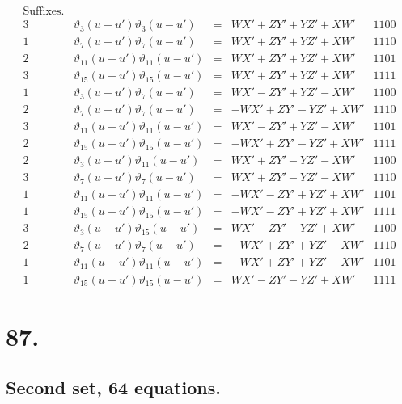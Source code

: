 \documentclass[11pt,a4paper]{article}
\newcommand{\uth}[1]{\vartheta_{#1}}
\begin{document}
\[
\begin{array}{ccccc}
\text{Suffixes.} & & & & \\
\hline
3 & \uth{3}(u+u')\uth{3}(u-u') &=& WX' + ZY' + YZ' + XW' & 1100 \\
1 & \uth{7}(u+u')\uth{7}(u-u') &=& WX' + ZY' + YZ' + XW' & 1110 \\
2 & \uth{11}(u+u')\uth{11}(u-u') &=& WX' + ZY' + YZ' + XW' & 1101 \\
3 & \uth{15}(u+u')\uth{15}(u-u') &=& WX' + ZY' + YZ' + XW' & 1111 \\
\hline
1 & \uth{3}(u+u')\uth{7}(u-u') &=& WX' - ZY' + YZ' - XW' & 1100 \\
2 & \uth{7}(u+u')\uth{7}(u-u') &=& -WX' + ZY' - YZ' + XW' & 1110 \\
3 & \uth{11}(u+u')\uth{11}(u-u') &=& WX' - ZY' + YZ' - XW' & 1101 \\
2 & \uth{15}(u+u')\uth{15}(u-u') &=& -WX' + ZY' - YZ' + XW' & 1111 \\
\hline
2 & \uth{3}(u+u')\uth{11}(u-u') &=& WX' + ZY' - YZ' - XW' & 1100 \\
3 & \uth{7}(u+u')\uth{7}(u-u') &=& WX' + ZY' - YZ' - XW' & 1110 \\
1 & \uth{11}(u+u')\uth{11}(u-u') &=& -WX' - ZY' + YZ' + XW' & 1101 \\
1 & \uth{15}(u+u')\uth{15}(u-u') &=& -WX' - ZY' + YZ' + XW' & 1111 \\
\hline
3 & \uth{3}(u+u')\uth{15}(u-u') &=& WX' - ZY' - YZ' + XW' & 1100 \\
2 & \uth{7}(u+u')\uth{7}(u-u') &=& -WX' + ZY' + YZ' - XW' & 1110 \\
1 & \uth{11}(u+u')\uth{11}(u-u') &=& -WX' + ZY' + YZ' - XW' & 1101 \\
1 & \uth{15}(u+u')\uth{15}(u-u') &=& WX' - ZY' - YZ' + XW' & 1111
\end{array}
\]

\newpage
\section*{87.}
\label{sec:87}

\subsection*{Second set, 64 equations.}
\end{document}
